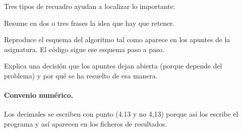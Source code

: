 Tres tipos de recuadro ayudan a localizar lo importante:

\begin{idea}
Resume en dos o tres frases la idea que hay que retener.
\end{idea}
\begin{apuntes}
Reproduce el esquema del algoritmo tal como aparece en los apuntes de la asignatura. El
código sigue ese esquema paso a paso.
\end{apuntes}
\begin{decision}
Explica una decisión que los apuntes dejan abierta (porque depende del problema) y por qué se
ha resuelto de esa manera.
\end{decision}

\paragraph{Convenio numérico.} Los decimales se escriben con punto (4.13 y no 4,13) porque
así los escribe el programa y así aparecen en los ficheros de resultados.
